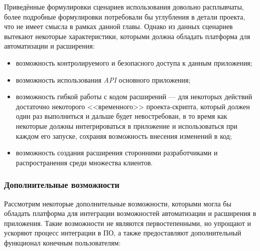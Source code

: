 Приведённые формулировки сценариев использования довольно расплывчаты, более подробные формулировки потребовали бы углубления в детали проекта, что не имеет смысла в рамках данной главы. Однако из данных сценариев вытекают некоторые характеристики, которыми должна обладать платформа для автоматизации и расширения:
\begin{itemize}
 \item возможность контролируемого и безопасного доступа к данным приложения;
 \item возможность использования {\it API} основного приложения;
 \item возможность гибкой работы с кодом расширений --- для некоторых действий достаточно некоторого <<временного>> проекта-скрипта, который должен один раз выполниться и дальше будет невостребован, в то время как некоторые должны интегрироваться в приложение и использоваться при каждом его запуске, сохраняя возможность внесения изменений в код;
 \item возможность создания расширения сторонними разработчиками и распространения среди множества клиентов.
\end{itemize}

\subsubsection{Дополнительные возможности}
Рассмотрим некоторые дополнительные возможности, которыми могла бы обладать платформа для интеграции возможностей автоматизации и расширения в приложения. Такие возможности не являются первостепенными, но упрощают и ускоряют процесс интеграции в ПО, а также предоставляют дополнительный функционал конечным пользователям:

